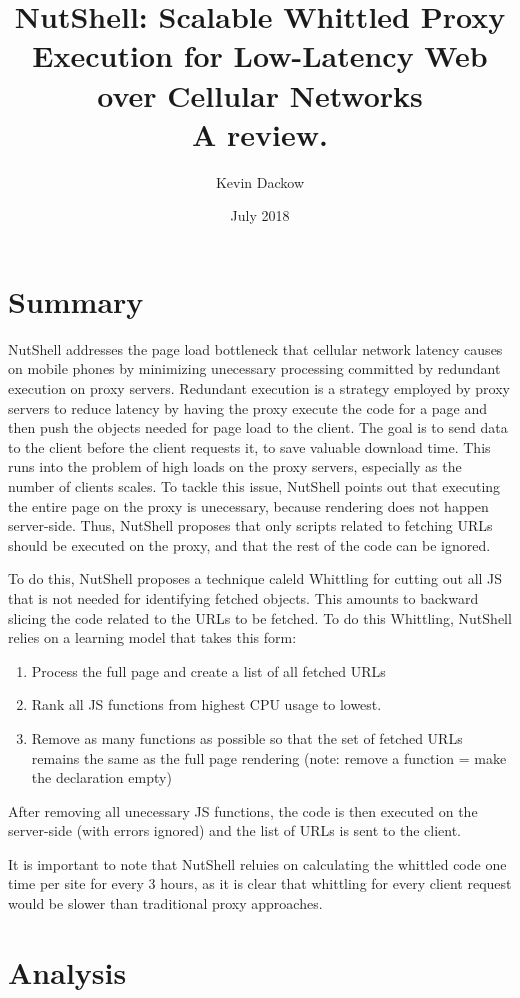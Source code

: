 \documentclass[10pt,letterpaper]{article}
\title{NutShell: Scalable Whittled Proxy Execution for Low-Latency Web over Cellular Networks \\ \textbf{A review.}}
\author{Kevin Dackow}
\date{July 2018}
\begin{document}
		\maketitle
\begin{multicols*}{2}[]
	\section{Summary}
    NutShell addresses the page load bottleneck that cellular network latency causes on mobile phones by minimizing unecessary processing committed by redundant execution on proxy servers. Redundant execution is a strategy employed by proxy servers to reduce latency by having the proxy execute the code for a page and then push the objects needed for page load to the client. The goal is to send data to the client before the client requests it, to save valuable download time. This runs into the problem of high loads on the proxy servers, especially as the number of clients scales. To tackle this issue, NutShell points out that executing the entire page on the proxy is unecessary, because rendering does not happen server-side. Thus, NutShell proposes that only scripts related to fetching URLs should be executed on the proxy, and that the rest of the code can be ignored.
    
    To do this, NutShell proposes a technique caleld Whittling for cutting out all JS that is not needed for identifying fetched objects. This amounts to backward slicing the code related to the URLs to be fetched. To do this Whittling, NutShell relies on a learning model that takes this form:
    \begin{enumerate}
            \item Process the full page and create a list of all fetched URLs
            \item Rank all JS functions from highest CPU usage to lowest.
            \item Remove as many functions as possible so that the set of fetched URLs remains the same as the full page rendering (note: remove a function = make the declaration empty)
    \end{enumerate}
    After removing all unecessary JS functions, the code is then executed on the server-side (with errors ignored) and the list of URLs is sent to the client.

    It is important to note that NutShell reluies on calculating the whittled code one time per site for every 3 hours, as it is clear that whittling for every client request would be slower than traditional proxy approaches.

    \section{Analysis}
    

    \newpage
    

\end{multicols*}
\end{document}
